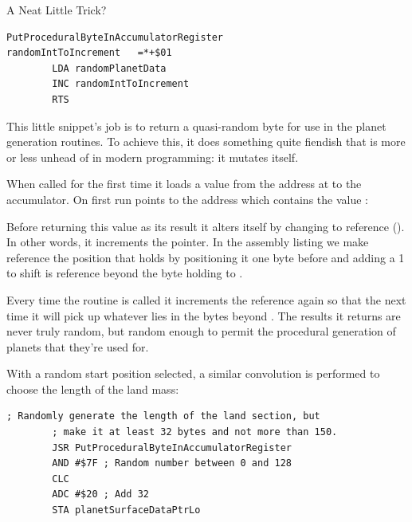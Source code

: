 \begin{q}
A Neat Little Trick?

\begin{lstlisting}[caption=Neat.]
PutProceduralByteInAccumulatorRegister
randomIntToIncrement   =*+$01
        LDA randomPlanetData
        INC randomIntToIncrement
        RTS
\end{lstlisting}

This little snippet's job is to return a quasi-random byte for use in the planet generation
routines. To achieve this, it does something quite fiendish that is more or less unhead of in modern
programming: it mutates itself.

When called for the first time it loads a value from the address at  to the accumulator. On first
run  points to the address  which contains the value :

%


Before returning this value as its result it alters itself by changing
 to reference  (). In other words, it increments the pointer. In the
assembly listing we make  reference the position
that holds  by positioning it one byte before and
adding a 1 to shift is reference beyond the byte holding  to
.

Every time the routine is called it increments the reference again so that the next time it will pick up whatever
  lies in the bytes beyond . The results it returns are never truly random, but random enough
  to permit the procedural generation of planets that they're used for.

\end{q}

With a random start position selected, a similar convolution is performed to choose the length of the land mass:

\begin{lstlisting}[caption=A convolution.]
        ; Randomly generate the length of the land section, but
        ; make it at least 32 bytes and not more than 150.
        JSR PutProceduralByteInAccumulatorRegister
        AND #$7F ; Random number between 0 and 128
        CLC
        ADC #$20 ; Add 32
        STA planetSurfaceDataPtrLo

\end{lstlisting}

